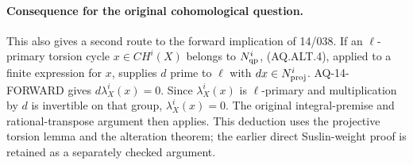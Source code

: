 \documentclass[11pt,a4paper]{article}
\theoremstyle{definition}\newtheorem{definition}[theorem]{Definition}
\theoremstyle{remark}\newtheorem{remark}[theorem]{Remark}
\begin{document}
\paragraph{Consequence for the original cohomological question.}
This also gives a second route to the forward implication
of 14/038.  If an $\ell$-primary torsion cycle
$x\in CH^i(X)$ belongs to $N^i_{\rm qp}$, (AQ.ALT.4),
applied to a finite expression for $x$, supplies
$d$ prime to $\ell$ with $dx\in N^i_{\rm proj}$.
AQ-14-FORWARD gives $d\lambda_X^i(x)=0$.
Since $\lambda_X^i(x)$ is $\ell$-primary and
multiplication by $d$ is invertible on that group,
$\lambda_X^i(x)=0$.
The original integral-premise and rational-transpose
argument then applies.  This deduction uses the
projective torsion lemma and the alteration theorem;
the earlier direct Suslin-weight proof is retained
as a separately checked argument.
\end{document}

